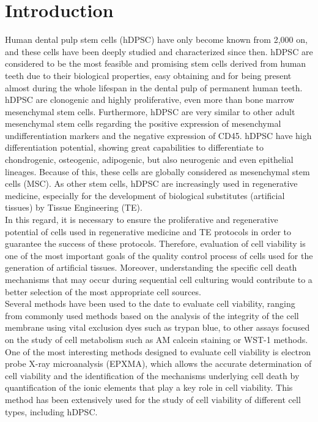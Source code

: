 \documentclass[a4paper,12pt]{article}
\begin{document}
\twocolumn
\section{Introduction}
Human dental pulp stem cells (hDPSC) have only become known from 2,000 on, and these cells have been deeply studied and characterized since then. hDPSC are considered to be the most feasible and promising stem cells derived from human teeth due to their biological properties, easy obtaining and for being present almost during the whole lifespan in the dental pulp of permanent human teeth. hDPSC are clonogenic and highly proliferative, even more than bone marrow mesenchymal stem cells. Furthermore, hDPSC are very similar to other adult mesenchymal stem cells regarding the positive expression of mesenchymal undifferentiation markers and the negative expression of CD45. hDPSC have high differentiation potential, showing great capabilities to differentiate to chondrogenic, osteogenic, adipogenic, but also neurogenic and even epithelial lineages. Because of this, these cells are globally considered as mesenchymal stem cells (MSC). As other stem cells, hDPSC are increasingly used in regenerative medicine, especially for the development of biological substitutes (artificial tissues) by Tissue Engineering (TE).\\
In this regard, it is necessary to ensure the proliferative and regenerative potential of cells used in regenerative medicine and TE protocols in order to guarantee the success of these protocols. Therefore, evaluation of cell viability is one of the most important goals of the quality control process of cells used for the generation of artificial tissues. Moreover, understanding the specific cell death mechanisms that may occur during sequential cell culturing would contribute to a better selection of the most appropriate cell sources.\\
Several methods have been used to the date to evaluate cell viability, ranging from commonly used methods based on the analysis of the integrity of the cell membrane using vital exclusion dyes such as trypan blue, to other assays focused on the study of cell metabolism such as AM calcein staining or WST-1 methods. One of the most interesting methods designed to evaluate cell viability is electron probe X-ray microanalysis (EPXMA), which allows the accurate determination of cell viability and the identification of the mechanisms underlying cell death by quantification of the ionic elements that play a key role in cell viability. This method has been extensively used for the study of cell viability of different cell types, including hDPSC.\\
\end{document}
